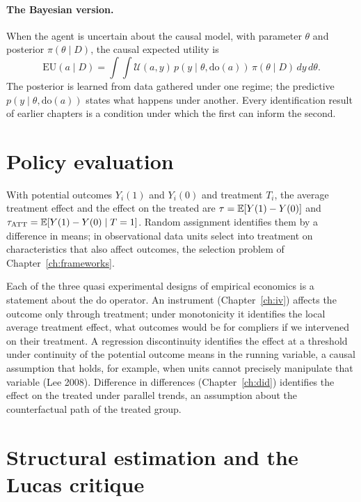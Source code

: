 \paragraph{The Bayesian version.} When the agent is uncertain about the causal model, with parameter $\theta$ and posterior $\pi(\theta\mid D)$, the causal expected utility is
\begin{equation}\label{cdt:eq:bayes}
\mathrm{EU}(a\mid D) = \int\!\!\int \mathcal{U}(a, y)\, p(y \mid \theta, \mathrm{do}(a))\,\pi(\theta\mid D)\,dy\,d\theta .
\end{equation}
The posterior is learned from data gathered under one regime; the predictive $p(y\mid\theta,\mathrm{do}(a))$ states what happens under another. Every identification result of earlier chapters is a condition under which the first can inform the second.

\section{Policy evaluation}\label{cdt:sec:policy}

With potential outcomes $Y_i(1)$ and $Y_i(0)$ and treatment $T_i$, the average treatment effect and the effect on the treated are $\tau = \mathbb{E}[Y(1)-Y(0)]$ and $\tau_{\mathrm{ATT}} = \mathbb{E}[Y(1)-Y(0)\mid T=1]$. Random assignment identifies them by a difference in means; in observational data units select into treatment on characteristics that also affect outcomes, the selection problem of Chapter~\ref{ch:frameworks}.

Each of the three quasi experimental designs of empirical economics is a statement about the do operator. An instrument (Chapter~\ref{ch:iv}) affects the outcome only through treatment; under monotonicity it identifies the local average treatment effect, what outcomes would be for compliers if we intervened on their treatment. A regression discontinuity identifies the effect at a threshold under continuity of the potential outcome means in the running variable, a causal assumption that holds, for example, when units cannot precisely manipulate that variable (Lee 2008). Difference in differences (Chapter~\ref{ch:did}) identifies the effect on the treated under parallel trends, an assumption about the counterfactual path of the treated group. 

\section{Structural estimation and the Lucas critique}\label{cdt:sec:lucas}

